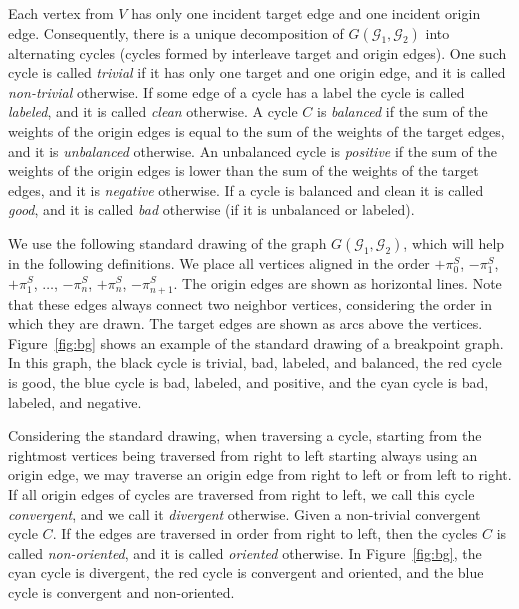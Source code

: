 \documentclass[12pt]{article}
\begin{document}
Each vertex from $V$ has only one incident target edge and one incident origin edge. Consequently, there is a unique decomposition of $G(\mathcal{G}_1,\mathcal{G}_2)$ into alternating cycles (cycles formed by interleave target and origin edges). One such cycle is called \emph{trivial} if it has only one target and one origin edge, and it is called \emph{non-trivial} otherwise. If some edge of a cycle has a label the cycle is called \emph{labeled}, and it is called \emph{clean} otherwise. A cycle $C$ is \emph{balanced} if the sum of the weights of the origin edges is equal to the sum of the weights of the target edges, and it is \emph{unbalanced} otherwise. An unbalanced cycle is \emph{positive} if the sum of the weights of the origin edges is lower than the sum of the weights of the target edges, and it is \emph{negative} otherwise. If a cycle is balanced and clean it is called \emph{good}, and it is called \emph{bad} otherwise (if it is unbalanced or labeled).

We use the following standard drawing of the graph $G(\mathcal{G}_1,\mathcal{G}_2)$, which will help in the following definitions. We place all vertices aligned in the order $+\pi^S_0$, $-\pi^S_1$, $+\pi^S_1$, $\ldots$, $-\pi^S_{n}$, $+\pi^S_{n}$, $-\pi^S_{n+1}$. The origin edges are shown as horizontal lines. Note that these edges always connect two neighbor vertices, considering the order in which they are drawn. The target edges are shown as arcs above the vertices. Figure~\ref{fig:bg} shows an example of the standard drawing of a breakpoint graph. In this graph, the black cycle is trivial, bad, labeled, and balanced, the red cycle is good, the blue cycle is bad, labeled, and positive, and the cyan cycle is bad, labeled, and negative.



Considering the standard drawing, when traversing a cycle, starting from the rightmost vertices being traversed from right to left starting always using an origin edge, we may traverse an origin edge from right to left or from left to right. If all origin edges of cycles are traversed from right to left, we call this cycle \emph{convergent}, and we call it \emph{divergent} otherwise. Given a non-trivial convergent cycle $C$. If the edges are traversed in order from right to left, then the cycles $C$ is called \emph{non-oriented}, and it is called \emph{oriented} otherwise. In Figure~\ref{fig:bg}, the cyan cycle is divergent, the red cycle is convergent and oriented, and the blue cycle is convergent and non-oriented.
\end{document}

